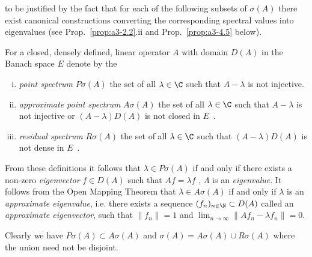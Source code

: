 to be justified by the fact that for each of the following subsets of $\sigma(A)$ there exist canonical constructions converting the corresponding spectral values into eigenvalues (see Prop.~\ref{prop:a3-2.2}.ii and Prop.~\ref{prop:a3-4.5} below).
\begin{definition}\label{def:a3-2.1}
For a closed, densely defined, linear operator $A$ with domain $D(A)$ in the Banach space $E$ denote by the
\begin{enumerate}[(i)]
\item 
\emph{point spectrum} $P\sigma(A)$ the set of all $\lambda \in \C$ such that $A - \lambda$ is not injective.

\item 
\emph{approximate point spectrum} $A\sigma(A)$ the set of all $\lambda \in \C$ such that $A - \lambda$ is not injective or $(A - \lambda)D(A)$ is not closed in $E$~.

\item 
\emph{residual spectrum} $R\sigma(A)$ the set of all $\lambda \in \C$ such that $(A - \lambda)D(A)$ is not dense in $E$~.
\end{enumerate}
\end{definition}
From these definitions it follows that $\lambda \in P\sigma(A)$ if and only if there exists a non-zero \emph{eigenvector} $f \in D(A)$ such that $Af = \lambda f$ \ie, $\Lambda$ is an \emph{eigenvalue}.
It follows from the Open Mapping Theorem that $\lambda \in A\sigma(A)$ if and only if $\lambda$ is an \emph{approximate eigenvalue}, i.e. there exists a sequence $(f_{n})_{n \in \N} \subset D(A)$ called an\emph{ approximate eigenvector}, such that $\|f_{n}\| = 1$ and $ \lim_{n \to \infty} \|Af_{n} - \lambda f_{n}\| = 0$.


Clearly we have $P\sigma(A) \subset A\sigma(A)$ and $\sigma(A) = A\sigma(A) \cup R\sigma(A)$ where the union need not be disjoint.

